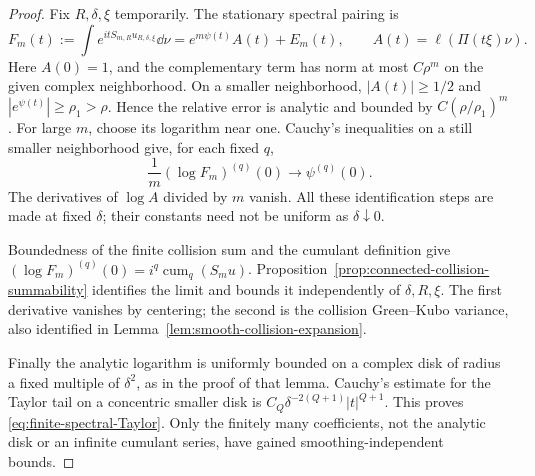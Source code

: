 \begin{proof}
Fix $R,\delta,\xi$ temporarily. The stationary spectral pairing is
\[
 F_m(t):=\int e^{itS_{m,R}u_{R,\delta,\xi}}\dd\nu
               =e^{m\psi(t)}A(t)+E_m(t),\qquad A(t)=\ell(\Pi(t\xi)\nu).
\]
Here $A(0)=1$, and the complementary term has norm at most $C\rho^m$
on the given complex neighborhood. On a smaller neighborhood,
$|A(t)|\ge1/2$ and $|e^{\psi(t)}|\ge\rho_1>\rho$. Hence the relative
error is analytic and bounded by $C(\rho/\rho_1)^m$. For large $m$,
choose its logarithm near one. Cauchy's inequalities on a still smaller
neighborhood give, for each fixed $q$,
\[
 \frac1m(\log F_m)^{(q)}(0)\longrightarrow\psi^{(q)}(0).
\]
The derivatives of $\log A$ divided by $m$ vanish. All these
identification steps are made at fixed $\delta$; their constants need
not be uniform as $\delta\downarrow0$.

Boundedness of the finite collision sum and the cumulant definition
give $(\log F_m)^{(q)}(0)=i^q\operatorname{cum}_q(S_m u)$.
Proposition~\ref{prop:connected-collision-summability} identifies the
limit and bounds it independently of $\delta,R,\xi$.
The first derivative vanishes by centering; the second is the collision
Green--Kubo variance, also identified in
Lemma~\ref{lem:smooth-collision-expansion}.

Finally the analytic logarithm is uniformly bounded on a complex disk
of radius a fixed multiple of $\delta^2$, as in the proof of that
lemma. Cauchy's estimate for the Taylor tail on a concentric smaller
disk is $C_Q\delta^{-2(Q+1)}|t|^{Q+1}$. This proves
\eqref{eq:finite-spectral-Taylor}. Only the finitely many coefficients,
not the analytic disk or an infinite cumulant series, have gained
smoothing-independent bounds.
\end{proof}

